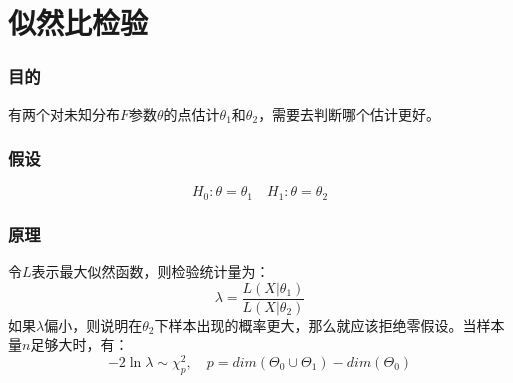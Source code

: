 \section{似然比检验}
\label{method:LikelihoodTest}
\subsubsection{目的}
有两个对未知分布$F$参数$\theta$的点估计$\theta_1$和$\theta_2$，需要去判断哪个估计更好。
\subsubsection{假设}
\begin{equation*}
	H_0:\theta=\theta_1\quad H_1:\theta=\theta_2
\end{equation*}
\subsubsection{原理}
令$L$表示最大似然函数，则检验统计量为：
\begin{equation*}
	\lambda=\frac{L(X|\theta_1)}{L(X|\theta_2)}
\end{equation*}
如果$\lambda$偏小，则说明在$\theta_2$下样本出现的概率更大，那么就应该拒绝零假设。当样本量$n$足够大时，有：
\begin{equation*}
	-2\ln\lambda\sim\chi_p^2,\quad p=dim(\varTheta_0\cup\varTheta_1)-dim(\varTheta_0)
\end{equation*}